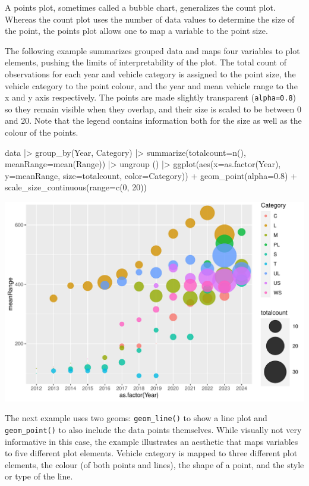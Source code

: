A points plot, sometimes called a bubble chart, generalizes the count plot. Whereas the count plot uses the number of data values to determine the size of the point, the points plot allows one to map a variable to the point size. 

The following example summarizes grouped data and maps four variables to plot elements, pushing the limits of interpretability of the plot. The total count of observations for each year and vehicle category is assigned to the point size, the vehicle category to the point colour, and the year and mean vehicle range to the x and y axis respectively. The points are made slightly transparent (\texttt{alpha=0.8}) so they remain visible when they overlap, and their size is scaled to be between 0 and 20. Note that the legend contains information both for the size as well as the colour of the points.

\begin{Rcode}
data |> 
  group_by(Year, Category) |>
  summarize(totalcount=n(), meanRange=mean(Range)) |>
  ungroup () |>
  ggplot(aes(x=as.factor(Year), y=meanRange, 
             size=totalcount, color=Category)) +
    geom_point(alpha=0.8) +
    scale_size_continuous(range=c(0, 20))
\end{Rcode}

\begin{center}
  \includegraphics[width=.8\textwidth]{fuel.pointsSize.pdf}
\end{center}

The next example uses two geoms: \texttt{geom\_line()} to show a line plot and \texttt{geom\_point()} to also include the data points themselves. While visually not very informative in this case, the example illustrates an aesthetic that maps variables to five different plot elements. Vehicle category is mapped to three different plot elements, the colour (of both points and lines), the shape of a point, and the style or type of the line.

